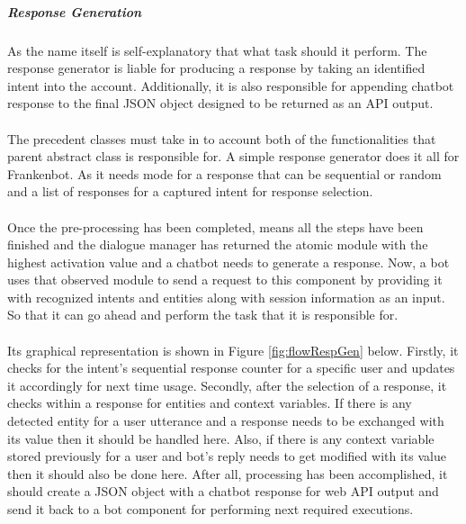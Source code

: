 \subparagraph*{Response Generation}
As the name itself is self-explanatory that what task should it perform. The response generator is liable for producing a response by taking an identified intent into the account. Additionally, it is also responsible for appending chatbot response to the final JSON object designed to be returned as an API output. 
\\~\\
The precedent classes must take in to account both of the functionalities that parent abstract class is responsible for. A simple response generator does it all for Frankenbot. As it needs mode for a response that can be sequential or random and a list of responses for a captured intent for response selection.
\\~\\
Once the pre-processing has been completed, means all the steps have been finished and the dialogue manager has returned the atomic module with the highest activation value and a chatbot needs to generate a response. Now, a bot uses that observed module to send a request to this component by providing it with recognized intents and entities along with session information as an input. So that it can go ahead and perform the task that it is responsible for. 
\\~\\
Its graphical representation is shown in Figure \ref{fig:flowRespGen} below. Firstly, it checks for the intent's sequential response counter for a specific user and updates it accordingly for next time usage. Secondly, after the selection of a response, it checks within a response for entities and context variables. If there is any detected entity for a user utterance and a response needs to be exchanged with its value then it should be handled here. Also, if there is any context variable stored previously for a user and bot's reply needs to get modified with its value then it should also be done here. After all, processing has been accomplished, it should create a JSON object with a chatbot response for web API output and send it back to a bot component for performing next required executions. 

